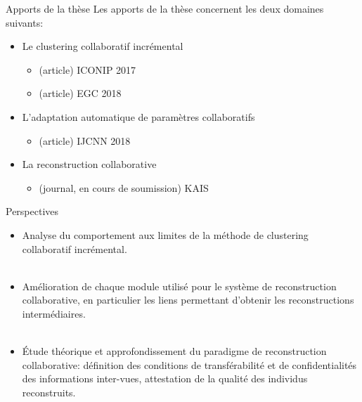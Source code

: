\documentclass[hyperref={pdfpagelabels=false}]{beamer}
\begin{document}
    \begin{frame}{Apports de la thèse}
        Les apports de la thèse concernent les deux domaines suivants:
        \begin{itemize}
            \item Le clustering collaboratif incrémental
                \begin{itemize}
                    \item (article) ICONIP 2017
                    \item (article) EGC 2018
                \end{itemize}
            \item L'adaptation automatique de paramètres collaboratifs
                \begin{itemize}
                    \item (article) IJCNN 2018
                \end{itemize}
            \item La reconstruction collaborative
                \begin{itemize}
                    \item (journal, en cours de soumission) KAIS
                \end{itemize}
        \end{itemize}
    \end{frame}

    \begin{frame}{Perspectives}
        \begin{itemize}
            \item Analyse du comportement aux limites de la méthode de 
                clustering collaboratif incrémental.\\~\\
            \item Amélioration de chaque module utilisé pour le système de 
                reconstruction collaborative, en particulier les liens 
                permettant d'obtenir les reconstructions intermédiaires.\\~\\
            \item Étude théorique et approfondissement du paradigme de
                reconstruction collaborative: définition des conditions de
                transférabilité et de confidentialités des informations
                inter-vues, attestation de la qualité des individus
                reconstruits.
        \end{itemize}
    \end{frame}
\end{document}
